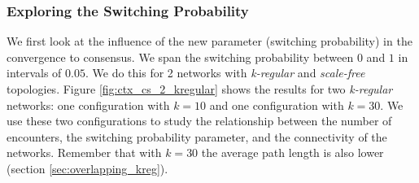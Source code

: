 \documentclass[preprint,number]{elsarticle}
\begin{document}
      \subsubsection{Exploring the Switching Probability}
      \noindent We first look at the influence of the new parameter (switching probability) in the
      convergence to consensus. We span the switching probability between $0$ and $1$ in intervals
      of $0.05$. We do this for 2 networks with \textit{k-regular} and \textit{scale-free}
      topologies. Figure \ref{fig:ctx_cs_2_kregular} shows the results for two \textit{k-regular}
      networks: one configuration with $k = 10$ and one configuration with $k = 30$. We use these
      two configurations to study the relationship between the number of encounters, the switching
      probability parameter, and the connectivity of the networks. Remember that with $k=30$ the
      average path length is also lower (section \ref{sec:overlapping_kreg}).
\end{document}
